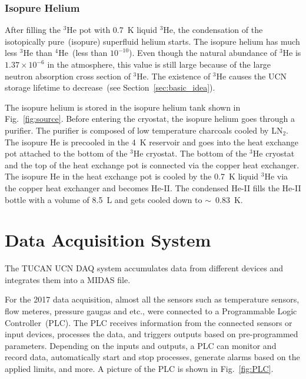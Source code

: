 \subsubsection{Isopure Helium}
After filling the $^3$He pot with 0.7~K liquid $^3$He, the
condensation of the isotopically pure~(isopure) superfluid helium
starts. The isopure helium has much less $^3$He than $^4$He~(less than
$10^{-10}$).  Even though the natural abundance of $^3$He is
$1.37 \times 10^{-6}$ in the atmosphere, this value is still large
because of the large neutron absorption cross section of $^3$He. The
existence of $^3$He causes the UCN storage lifetime to decrease~(see
Section~\ref{sec:basic_idea}).

The isopure helium is stored in the isopure helium tank shown in
Fig.~\ref{fig:source}. Before entering the cryostat, the isopure
helium goes through a purifier. The purifier is composed of low
temperature charcoals cooled by LN$_2$.  The isopure He is precooled
in the 4~K reservoir and goes into the heat exchange pot attached to
the bottom of the $^3$He cryostat. The bottom of the $^3$He cryostat
and the top of the heat exchange pot is connected via the copper heat
exchanger. The isopure He in the heat exchange pot is cooled by the
0.7~K liquid $^3$He via the copper heat exchanger and becomes
He-II. The condensed He-II fills the He-II bottle with a volume of
8.5~L and gets cooled down to $\sim$~0.83~K.




\section{Data Acquisition System\label{sec:DAQ}}
The TUCAN UCN DAQ system accumulates data from different devices and
integrates them into a MIDAS file.

For the 2017 data acquisition, almost all the sensors such as
temperature sensors, flow meteres, pressure gaugas and etc., were
connected to a Programmable Logic Controller~(PLC). The PLC receives
information from the connected sensors or input devices, processes the
data, and triggers outputs based on pre-programmed parameters.
Depending on the inputs and outputs, a PLC can monitor and record
data, automatically start and stop processes, generate alarms based on
the applied limits, and more. A picture of the PLC
is shown in Fig.~\ref{fig:PLC}.

